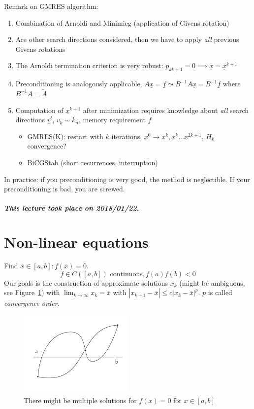 \documentclass{article}
\newcommand{\card}[1]{\left|#1\right|}
\newcommand{\dateref}[1]{\paragraph{\textit{This lecture took place on #1.}}}
\begin{document}
Remark on GMRES algorithm:
\begin{enumerate}
  \item Combination of Arnoldi and Minimieg (application of Givens rotation)
  \item Are other search directions considered, then we have to apply \emph{all} previous Givens rotations
  \item The Arnoldi termination criterion is very robust: $p_{kk+1} = 0 \implies \underline x = \underline x^{k+1}$
  \item Preconditioning is analogously applicable, $A \underline x = \underline f \leadsto B^{-1} A \underline x = B^{-1} \underline f$ where $B^{-1} A = \tilde A$
  \item Computation of $\underline x^{k+1}$ after minimization requires knowledge about \emph{all} search directions $\underline v^l$, $v_k \sim k_n$, memory requirement $f$
    \begin{itemize}
      \item GMRES(K): restart with $k$ iterations, $\underline x^0 \to \underline x^k, \underline x^k \ldots \underline x^{2k+1}$, $H_k$ convergence?
      \item BiCGStab (short recurrences, interruption)
    \end{itemize}
\end{enumerate}

In practice: if you preconditioning is very good, the method is neglectible. If your preconditioning is bad, you are screwed.

\dateref{2018/01/22}

\section{Non-linear equations}  %

Find $\overline x \in [a,b]: f(\overline x) = 0$.
\[ f \in C([a,b]) \text{ continuous}, f(a) f(b) < 0 \]
Our goals is the construction of approximate solutions $x_k$ (might be ambiguous, see Figure~\ref{img:ambsol})
with $\lim_{k\to\infty} x_k = \overline x$ with $\card{x_{k+1} - \overline x} \leq c \card{x_k - \overline x}^p$.
$p$ is called \emph{convergence order}.

\begin{figure}[!h]
  \begin{center}
    \includegraphics[width=0.5\textwidth]{img/11_ambiguous_solution.pdf}
    \caption{There might be multiple solutions for $f(x) = 0$ for $x \in [a,b]$}
    \label{img:ambsol}
  \end{center}
\end{figure}
\end{document}

